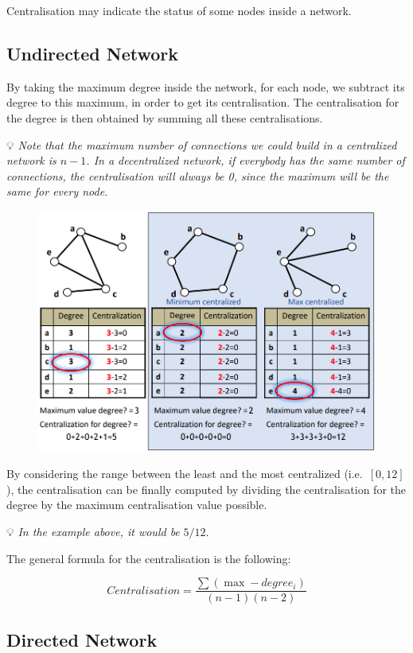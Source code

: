 \documentclass[
  notitlepage,
  onecolumn,
  openany]{book}
\begin{document}
Centralisation may indicate the status of some nodes inside a network.

\hypertarget{undirected-network-2}{%
\subsection{Undirected Network}\label{undirected-network-2}}

By taking the maximum degree inside the network, for each node, we subtract its degree to this maximum, in order to get its centralisation. The centralisation for the degree is then obtained by summing all these centralisations.

💡 \emph{Note that the maximum number of connections we could build in a centralized network is \(n-1\). In a decentralized network, if everybody has the same number of connections, the centralisation will always be 0, since the maximum will be the same for every node.}

\begin{figure}[h!]

{\centering \includegraphics[width=0.5\linewidth]{images/02-Basic Measures/Untitled} 

}

\end{figure}

By considering the range between the least and the most centralized (i.e.~\([0,12]\)), the centralisation can be finally computed by dividing the centralisation for the degree by the maximum centralisation value possible.

💡 \emph{In the example above, it would be} \(5/12\).

The general formula for the centralisation is the following:

\[
Centralisation = \frac{\sum (\max-degree_i)}{(n-1)(n-2)}
\]

\hypertarget{directed-network-2}{%
\subsection{Directed Network}\label{directed-network-2}}
\end{document}
